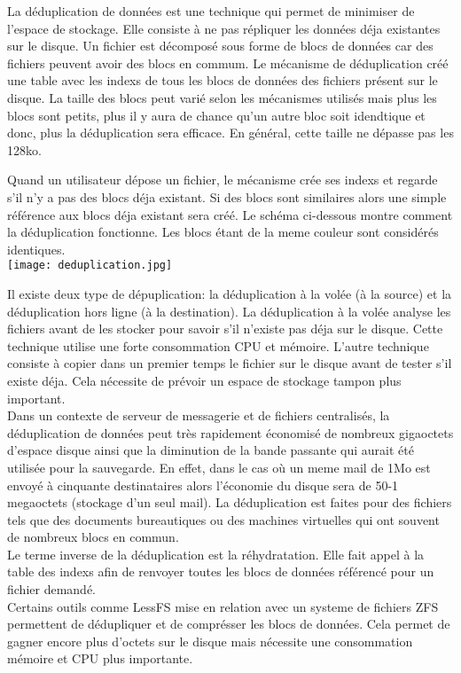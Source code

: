 \documentclass[a4paper]{report}
\begin{document}
	La déduplication de données est une technique qui permet de minimiser de l'espace de stockage. Elle consiste à ne pas répliquer les données déja existantes sur le disque. Un fichier est décomposé sous forme de blocs de données car des fichiers peuvent avoir des blocs en commum. Le mécanisme de déduplication créé une table avec les indexs de tous les blocs de données des fichiers présent sur le disque. La taille des blocs peut varié selon les mécanismes utilisés mais plus les blocs sont petits, plus il y aura de chance qu'un autre bloc soit idendtique et donc, plus la déduplication sera efficace. En général, cette taille ne dépasse pas les 128ko.
 
 Quand un utilisateur dépose un fichier, le mécanisme crée ses indexs et regarde s'il n'y a pas des blocs déja existant. Si des blocs sont similaires alors une simple référence aux blocs déja existant sera créé. Le schéma ci-dessous montre comment la déduplication fonctionne. Les blocs étant de la meme couleur sont considérés identiques.\\
\texttt{[image: deduplication.jpg]}

Il existe deux type de dépuplication: la déduplication à la volée (à la source) et la déduplication hors ligne (à la destination). La déduplication à la volée analyse les fichiers avant de les stocker pour savoir s'il n'existe pas déja sur le disque. Cette technique utilise une forte consommation CPU et mémoire. L'autre technique consiste à copier dans un premier temps le fichier sur le disque avant de tester s'il existe déja. Cela nécessite de prévoir un espace de stockage tampon plus important. \\

Dans un contexte de serveur de messagerie et de fichiers centralisés, la déduplication de données peut très rapidement économisé de nombreux gigaoctets d'espace disque ainsi que la diminution de la bande passante qui aurait été utilisée pour la sauvegarde. En effet, dans le cas où un meme mail de 1Mo est envoyé à cinquante destinataires alors l'économie du disque sera de 50-1 megaoctets (stockage d'un seul mail). La déduplication est faites pour des fichiers tels que des documents bureautiques ou des machines virtuelles qui ont souvent de nombreux blocs en commun.\\
Le terme inverse de la déduplication est la réhydratation. Elle fait appel à la table des indexs afin de renvoyer toutes les blocs de données référencé pour un fichier demandé.\\

Certains outils comme LessFS mise en relation avec un systeme de fichiers ZFS permettent de dédupliquer et de comprésser les blocs de données. Cela permet de gagner encore plus d'octets sur le disque mais nécessite une consommation mémoire et CPU plus importante.
\end{document}

